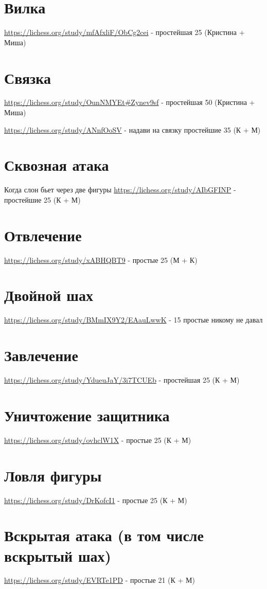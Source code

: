 \documentclass{article}
\begin{document}
\section{Вилка}
\url{https://lichess.org/study/mfAfxliF/ObCg2cei} - простейшая 25 
(Кристина + Миша)
\section{Связка}
\url{https://lichess.org/study/OunNMYEt#Zynev9sf} - простейшая 50
(Кристина + Миша)

\url{https://lichess.org/study/ANnfOoSV} - надави на связку
простейшие 35 (К + М)


\section{Сквозная атака}
Когда слон бьет через две фигуры
\url{https://lichess.org/study/AIbGFINP} - простейшие 25 (К + М)
\section{Отвлечение}
\url{https://lichess.org/study/xABHQBT9} - простые 25 (М + К)
\section{Двойной шах}
\url{https://lichess.org/study/BMmIX9Y2/EAauLwwK} - 15 простые никому не давал
\section{Завлечение}
\url{https://lichess.org/study/YdueuJaY/3i7TCUEb} - простейшая 25 (К + М)


\section{Уничтожение защитника}
\url{https://lichess.org/study/ovhclW1X} - простые 25 (К + М)

\section{Ловля фигуры}
\url{https://lichess.org/study/DrKofcI1} - простые 25 (К + М)
\section{Вскрытая атака (в том числе вскрытый шах)}
\url{https://lichess.org/study/EVRTe1PD} - простые 21 (К + М)
\end{document}
